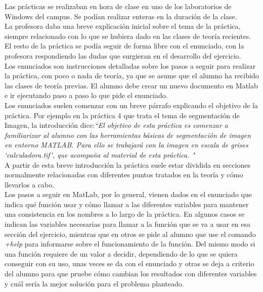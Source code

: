 Las prácticas se realizaban en hora de clase en uno de los laboratorios de Windows del campus. Se podían realizar enteras en la duración de la clase. \\

La profesora daba una breve explicación inicial sobre el tema de la práctica, siempre relacionado con lo que se hubiera dado en las clases de teoría recientes. El resto de la práctica se podía seguir de forma libre con el enunciado, con la profesora respondiendo las dudas que surgieran en el desarrollo del ejercicio. \\

Los enunciados son instrucciones detalladas sobre los pasos a seguir para realizar la práctica, con poco o nada de teoría, ya que se asume que el alumno ha recibido las clases de teoría previas. El alumno debe crear un nuevo documento en Matlab e ir ejecutando paso a paso lo que pide el enunciado. \\

Los enunciados suelen comenzar con un breve párrafo explicando el objetivo de la práctica. Por ejemplo en la práctica 4 que trata el tema de segmentación de Imagen, la introducción dice:\emph{``El objetivo de esta práctica es comenzar a familiarizar al alumno con las herramientas básicas de segmentación de imagen en entorno MATLAB. Para ello se trabajará con la imagen en escala de
grises ‘calculadora.tif’, que acompaña al material de esta práctica. "}\\

A partir de esta breve introducción la práctica suele estar dividida en secciones normalmente relacionadas con diferentes puntos tratados en la teoría y cómo llevarlos a cabo.\\

Los pasos a seguir en MatLab, por lo general, vienen dados en el enunciado que indica qué función usar y cómo llamar a las diferentes variables para mantener una consistencia en los nombres a lo largo de la práctica. En algunos casos se indican las variables necesarias para llamar a la función que se va a usar en esa sección del ejercicio, mientras que en otros se pide al alumno que use el comando \textsl{+help} para informarse sobre el funcionamiento de la función. Del mismo modo si una función requiere de un valor a decidir, dependiendo de lo que se quiera conseguir con su uso, unas veces se da con el enunciado y otras se deja a criterio del alumno para que pruebe cómo cambian los resultados con diferentes variables y cuál sería la mejor solución para el problema planteado.\\

